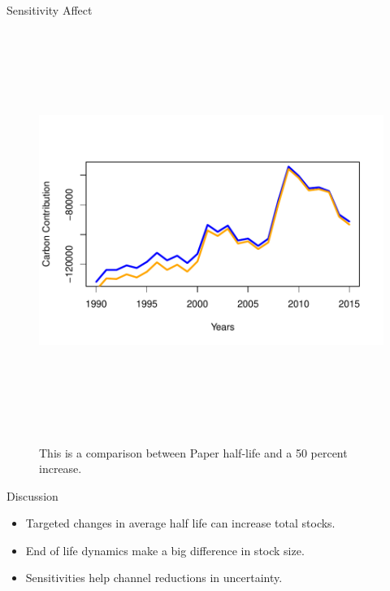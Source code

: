 \documentclass[final]{beamer}\usepackage[]{graphicx}\usepackage[]{color}
\newlength{\onecolwid}
\begin{document}
\begin{frame}[t]
\begin{columns}[t]
\begin{column}{\onecolwid}
\begin{block}{Sensitivity Affect}
\begin{center}
\begin{figure}
    {\includegraphics[width=1\linewidth, height = 13cm]{CopyOfTSPlot.pdf}}
    \caption{This is a comparison between Paper half-life and a 50 percent increase.}
\end{figure}
\end{center}
\end{block}




\begin{block}{Discussion}

\begin{itemize}
\item Targeted changes in average half life can increase total stocks.
\item End of life dynamics make a big difference in stock size.
\item Sensitivities help channel reductions in uncertainty.
\end{itemize}

\end{block}




\end{column}
\end{columns}
\end{frame}
\end{document}
